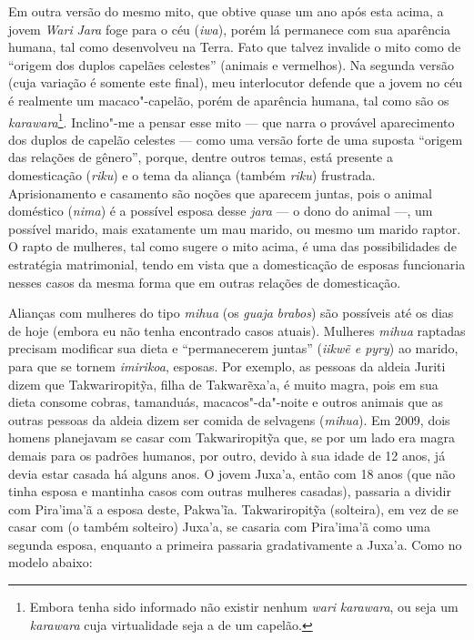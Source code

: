 Em outra versão do mesmo mito, que obtive quase um ano após esta acima,
a jovem \emph{Wari} \emph{Jara} foge para o céu (\emph{iwa}), porém lá
permanece com sua aparência humana, tal como desenvolveu na Terra. Fato
que talvez invalide o mito como de ``origem dos duplos capelães celestes''
(animais e vermelhos). Na segunda versão (cuja variação é somente este
final), meu interlocutor defende que a jovem no céu é realmente um
macaco"-capelão, porém de aparência humana, tal como são os
\emph{karawara}\footnote{Embora tenha sido informado não existir nenhum
  \emph{wari} \emph{karawara}, ou seja um \emph{karawara} cuja
  virtualidade seja a de um capelão.}. Inclino"-me a pensar esse mito ---
que narra o provável aparecimento dos duplos de capelão celestes --- como
uma versão forte de uma suposta ``origem das relações de gênero'', porque,
dentre outros temas, está presente a domesticação (\emph{riku}) e o tema
da aliança (também \emph{riku}) frustrada. Aprisionamento e casamento
são noções que aparecem juntas, pois o animal doméstico (\emph{nima}) é
a possível esposa desse \emph{jara} --- o dono do animal ---, um possível
marido, mais exatamente um mau marido, ou mesmo um marido raptor. O
rapto de mulheres, tal como sugere o mito acima, é uma das
possibilidades de estratégia matrimonial, tendo em vista que a
domesticação de esposas funcionaria nesses casos da mesma forma que em
outras relações de domesticação.

Alianças com mulheres do tipo \emph{mihua} (os \emph{guaja}
\emph{brabos}) são possíveis até os dias de hoje (embora eu não tenha
encontrado casos atuais). Mulheres \emph{mihua} raptadas precisam
modificar sua dieta e ``permanecerem juntas'' (\emph{iikwẽ e pyry}) ao
marido, para que se tornem \emph{imirikoa}, esposas. Por exemplo, as
pessoas da aldeia Juriti dizem que Takwariropitỹa, filha de Takwarẽxa'a,
é muito magra, pois em sua dieta consome cobras, tamanduás,
macacos"-da"-noite e outros animais que as outras pessoas da aldeia dizem
ser comida de selvagens (\emph{mihua}). Em 2009, dois homens planejavam
se casar com Takwariropitỹa que, se por um lado era magra demais para os
padrões humanos, por outro, devido à sua idade de 12 anos, já devia
estar casada há alguns anos. O jovem Juxa'a, então com 18 anos (que não
tinha esposa e mantinha casos com outras mulheres casadas), passaria a
dividir com Pira'ima'ã a esposa deste, Pakwa'ĩa. Takwariropitỹa
(solteira), em vez de se casar com (o também solteiro) Juxa'a, se
casaria com Pira'ima'ã como uma segunda esposa, enquanto a primeira
passaria gradativamente a Juxa'a. Como no modelo abaixo:

